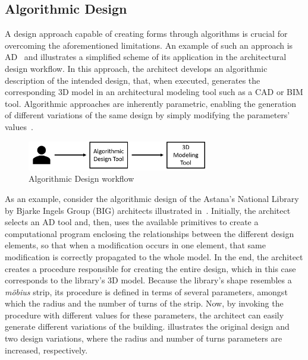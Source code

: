 \subsection{Algorithmic Design}

	A design approach capable of creating forms through algorithms is crucial for overcoming the aforementioned limitations. An example of such an approach is \ac{AD}~\cite{Branco2017AD} and  illustrates a simplified scheme of its application in the architectural design workflow. In this approach, the architect develops an algorithmic description of the intended design, that, when executed, generates the corresponding 3D model in an architectural modeling tool such as a \ac{CAD} or \ac{BIM} tool. Algorithmic approaches are inherently parametric, enabling the generation of different variations of the same design by simply modifying the parameters' values~\cite{Leitao2014GD}. 
	
\begin{figure}[htbp]
\centering
\includegraphics[width=0.70\textwidth]{./Images/Introduction/AlgorithmicArchitecturalDesign.png}
\caption[General view of the Algorithmic Design Approach]{Algorithmic Design workflow}
\label{fig:algorithmicdesign}
\end{figure}
	
	As an example, consider the algorithmic design of the Astana's National Library by Bjarke Ingels Group (BIG) architects illustrated in~. Initially, the architect selects an \ac{AD} tool and, then, uses the available primitives to create a computational program enclosing the relationships between the different design elements, so that when a modification occurs in one element, that same modification is correctly propagated to the whole model. In the end, the architect creates a procedure responsible for creating the entire design, which in this case corresponds to the library's 3D model. Because the library's shape resembles a \textit{möbius} strip, its procedure is defined in terms of several parameters, amongst which the radius and the number of turns of the strip. Now, by invoking the procedure with different values for these parameters, the architect can easily generate different variations of the building.  illustrates the original design and two design variations, where the radius and number of turns parameters are increased, respectively. 
	
